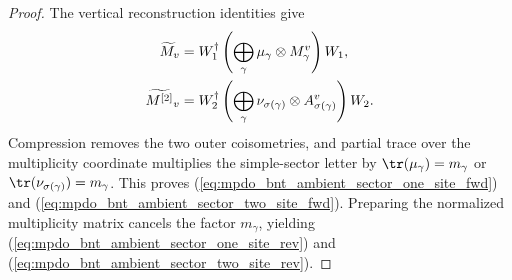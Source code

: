 \begin{proof}\leanok
    The vertical reconstruction identities give
    \begin{align}
        \widetilde M_v
         & =W_1^\dagger\left(\bigoplus_\gamma
        \mu_\gamma\otimes M_\gamma^v\right)W_1,
        \notag                                \\
        \widetilde{M^{[2]}}_v
         & =W_2^\dagger\left(\bigoplus_\gamma
        \nu_{\sigma(\gamma)}\otimes A_{\sigma(\gamma)}^v\right)W_2.
        \notag
    \end{align}
    Compression removes the two outer coisometries, and partial trace over the
    multiplicity coordinate multiplies the simple-sector letter by
    $\tr(\mu_\gamma)=m_\gamma$ or
    $\tr(\nu_{\sigma(\gamma)})=m_\gamma$.  This proves
    (\ref{eq:mpdo_bnt_ambient_sector_one_site_fwd}) and
    (\ref{eq:mpdo_bnt_ambient_sector_two_site_fwd}).  Preparing the
    normalized multiplicity matrix cancels the factor $m_\gamma$, yielding
    (\ref{eq:mpdo_bnt_ambient_sector_one_site_rev}) and
    (\ref{eq:mpdo_bnt_ambient_sector_two_site_rev}).
\end{proof}
